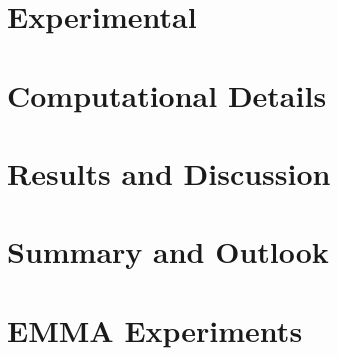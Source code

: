 \documentclass[a4paper,titlepage]{scrreprt}
\begin{document}
\chapter{Experimental}
\label{sec:exp}
%

\chapter{Computational Details}
\label{sec:comp}
%

\chapter{Results and Discussion}
\label{sec:results}
%
%
%
%

\chapter{Summary and Outlook}
\label{sec:outlook}





\clearpage

\appendix
\chapter{EMMA Experiments}
\label{sec:app-emma}

\end{document}
